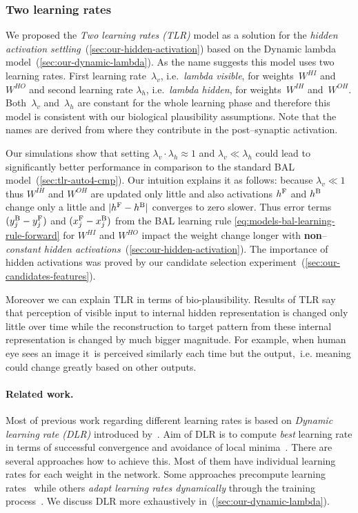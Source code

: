 
\subsubsection{Two learning rates} 
\label{sec:our-tlr}

We proposed the \emph{Two learning rates (TLR)} model as a solution for the \emph{hidden activation settling}~(\ref{sec:our-hidden-activation}) based on the Dynamic lambda model~(\ref{sec:our-dynamic-lambda}). As the name suggests this model uses two learning rates. First learning rate~$\lambda_v$, i.e.~\emph{lambda visible}, for weights~$W^{HI}$ and~$W^{HO}$ and second learning rate $\lambda_h$, i.e.~\emph{lambda hidden}, for weights~$W^{IH}$ and~$W^{OH}$. Both~$\lambda_v$ and~$\lambda_h$ are constant for the whole learning phase and therefore this model is consistent with our biological plausibility assumptions. Note that the names are derived from where they contribute in the post--synaptic activation. 

Our simulations show that setting $\lambda_v \cdot \lambda_h \approx 1$ and $\lambda_v \ll \lambda_h$ could lead to significantly better performance in comparison to the standard BAL model~(\ref{sec:tlr-auto4-cmp}). Our intuition explains it as follows: because $\lambda_v \ll 1$ thus $W^{IH}$ and $W^{OH}$ are updated only little and also activations $h^{\rm F}$ and $h^{\rm B}$ change only a little and $|h^{\rm F}- h^{\rm B}|$ converges to zero slower. Thus error terms $(y_j^{\rm B} - y_j^{\rm F})$ and $(x_j^{\rm F} - x_j^{\rm B})$ from the BAL learning rule \ref{eq:models-bal-learning-rule-forward} for $W^{HI}$ and $W^{HO}$ impact the weight change longer with {\bf non}--\emph{constant hidden activations}~(\ref{sec:our-hidden-activation}). The importance of hidden activations was proved by our candidate selection experiment~(\ref{sec:our-candidates-features}). 

Moreover we can explain TLR in terms of bio-plausibility. Results of TLR say that perception of visible input to internal hidden representation is changed only little over time while the reconstruction to target pattern from these internal representation is changed by much bigger magnitude. For example, when human eye sees an image it~is perceived similarly each time but the output,~i.e. meaning could change greatly based on other outputs. 

\paragraph{Related work.} 
\label{sec:our-tlr-related-work}
Most of previous work regarding different learning rates is based on \emph{Dynamic learning rate (DLR)} introduced by~\citet{jacobs1988increased}. Aim of DLR is to compute \emph{best} learning rate in terms of successful convergence and avoidance of local minima~\citep{behera2006adaptive}. There are several approaches how to achieve this. Most of them have individual learning rates for each weight in the network. Some approaches precompute learning rates~\citep{weir1991method} while others \emph{adapt learning rates dynamically} through the training process~\citep{yu1997efficient, magoulas1999improving, yu2002backpropagation}. We discuss DLR more exhaustively in~(\ref{sec:our-dynamic-lambda}). 

